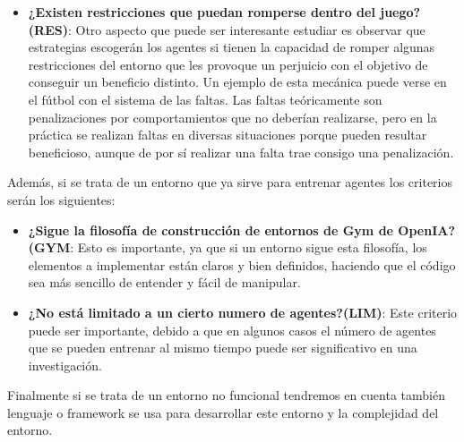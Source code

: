 \begin{itemize}
    \item \textbf{¿Existen restricciones que puedan romperse dentro del juego?(RES)}: Otro aspecto que puede ser interesante estudiar es observar que estrategias escogerán los agentes si tienen la capacidad de romper algunas restricciones del entorno que les provoque un perjuicio con el objetivo de conseguir un beneficio distinto. Un ejemplo de esta mecánica puede verse en el fútbol con el sistema de las faltas. Las faltas teóricamente son penalizaciones por comportamientos que no deberían realizarse, pero en la práctica se realizan faltas en diversas situaciones porque pueden resultar beneficioso, aunque de por sí realizar una falta trae consigo una penalización.
\end{itemize}

Además, si se trata de un entorno que ya sirve para entrenar agentes los criterios serán los siguientes:
\begin{itemize}
    \item \textbf{¿Sigue la filosofía de construcción de entornos de Gym de OpenIA?(GYM}: Esto es importante, ya que si un entorno sigue esta filosofía, los elementos a implementar están claros y bien definidos, haciendo que el código sea más sencillo de entender y fácil de manipular. 
    \item \textbf{¿No está limitado a un cierto numero de agentes?(LIM)}: Este criterio puede ser importante, debido a que en algunos casos el número de agentes que se pueden entrenar al mismo tiempo puede ser significativo en una investigación.
\end{itemize}

Finalmente si se trata de un entorno no funcional tendremos en cuenta también lenguaje o framework se usa para desarrollar este entorno y la complejidad del entorno.




